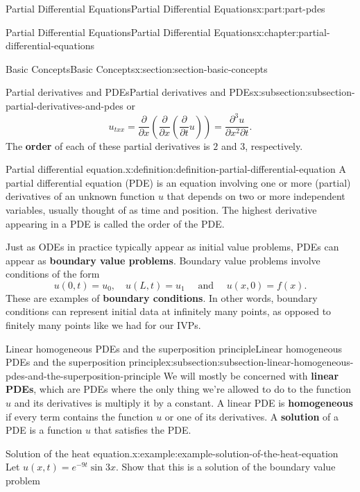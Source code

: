 \documentclass[twoside,10pt,]{book}
\newcommand{\terminology}[1]{\textbf{#1}}
\numberwithin{equation}{part}
\begin{document}
\begin{partptx}{Partial Differential Equations}{}{Partial Differential Equations}{}{}{x:part:part-pdes}
\begin{chapterptx}{Partial Differential Equations}{}{Partial Differential Equations}{}{}{x:chapter:partial-differential-equations}
\begin{sectionptx}{Basic Concepts}{}{Basic Concepts}{}{}{x:section:section-basic-concepts}
\begin{subsectionptx}{Partial derivatives and PDEs}{}{Partial derivatives and PDEs}{}{}{x:subsection:subsection-partial-derivatives-and-pdes}
or%
\begin{equation*}
u_{txx} = \frac{\partial}{\partial x}\left(\frac{\partial}{\partial x}\left(\frac{\partial}{\partial t}u\right)\right) = \frac{\partial^{3}u}{\partial x^{2}\partial t}.
\end{equation*}
The \terminology{order} of each of these partial derivatives is \(2\) and \(3\), respectively.%
\begin{definition}{Partial differential equation.}{x:definition:definition-partial-differential-equation}%
%
A partial differential equation (PDE) is an equation involving one or more (partial) derivatives of an unknown function \(u\) that depends on two or more independent variables, usually thought of as time and position. The highest derivative appearing in a PDE is called the order of the PDE.%
\end{definition}
Just as ODEs in practice typically appear as initial value problems, PDEs can appear as \terminology{boundary value problems}. Boundary value problems involve conditions of the form%
\begin{equation*}
u(0,t) = u_{0},\quad u(L,t) = u_{1} \quad \text{ and }\quad u(x,0) = f(x).
\end{equation*}
These are examples of \terminology{boundary conditions}. In other words, boundary conditions can represent initial data at infinitely many points, as opposed to finitely many points like we had for our IVPs.%
\end{subsectionptx}
%
%
\typeout{************************************************}
\typeout{************************************************}
%
\begin{subsectionptx}{Linear homogeneous PDEs and the superposition principle}{}{Linear homogeneous PDEs and the superposition principle}{}{}{x:subsection:subsection-linear-homogeneous-pdes-and-the-superposition-principle}
We will mostly be concerned with \terminology{linear PDEs}, which are PDEs where the only thing we're allowed to do to the function \(u\) and its derivatives is multiply it by a constant. A linear PDE is \terminology{homogeneous} if every term contains the function \(u\) or one of its derivatives. A \terminology{solution} of a PDE is a function \(u\) that satisfies the PDE.%
\begin{example}{Solution of the heat equation.}{x:example:example-solution-of-the-heat-equation}%
Let \(u(x,t) = e^{-9t}\sin3x\). Show that this is a solution of the boundary value problem%

\end{example}
\end{subsectionptx}
\end{sectionptx}
\end{chapterptx}
\end{partptx}
\end{document}
